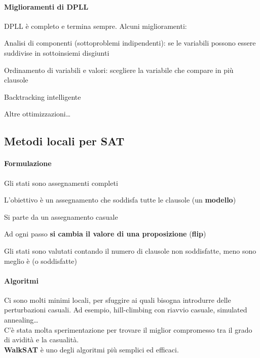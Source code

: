 \documentclass[10pt]{book}
\begin{document}
\paragraph{Miglioramenti di DPLL} DPLL è completo e termina sempre. Alcuni miglioramenti:
\begin{list}{}{}
	\item Analisi di componenti (sottoproblemi indipendenti): se le variabili possono essere suddivise in sottoinsiemi disgiunti
	\item Ordinamento di variabili e valori: scegliere la variabile che compare in più clausole
	\item Backtracking intelligente
	\item Altre ottimizzazioni\ldots
\end{list}
\pagebreak
\subsection{Metodi locali per SAT}
\paragraph{Formulazione}
\begin{list}{}{}
	\item Gli stati sono assegnamenti completi
	\item L'obiettivo è un assegnamento che soddisfa tutte le clausole (un \textbf{modello})
	\item Si parte da un assegnamento casuale
	\item Ad ogni passo \textbf{si cambia il valore di una proposizione} (\textbf{flip})
	\item Gli stati sono valutati contando il numero di clausole non soddisfatte, meno sono meglio è (o soddisfatte)
\end{list}
\paragraph{Algoritmi} Ci sono molti minimi locali, per sfuggire ai quali bisogna introdurre delle perturbazioni casuali. Ad esempio, hill-climbing con riavvio casuale, simulated annealing\ldots\\
C'è stata molta sperimentazione per trovare il miglior compromesso tra il grado di avidità e la casualità.\\
\textbf{WalkSAT} è uno degli algoritmi più semplici ed efficaci.
\end{document}
